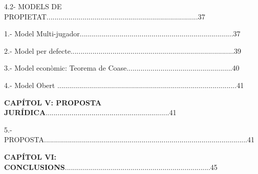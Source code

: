 \documentclass[12pt]{article}
\begin{document}
\vspace{\baselineskip}
\begin{justify}
4.2- MODELS DE PROPIETAT............................................................................37
\end{justify}\par


\vspace{\baselineskip}
1.- Model Multi-jugador.............................................................................37\par


\vspace{\baselineskip}
2.- Model per defecte..................................................................................39\par


\vspace{\baselineskip}
3.- Model econòmic: Teorema de Coase.....................................................40\par


\vspace{\baselineskip}
4.- Model Obert ..........................................................................................41\par


\vspace{\baselineskip}
\begin{justify}
\textbf{CAPÍTOL V: PROPOSTA JURÍDICA}..............................................................41
\end{justify}\par


\vspace{\baselineskip}
\begin{justify}
5.- PROPOSTA......................................................................................................41
\end{justify}\par


\vspace{\baselineskip}

\vspace{\baselineskip}
\begin{justify}
\textbf{CAPÍTOL VI: CONCLUSIONS}.........................................................................45
\end{justify}\par


\vspace{\baselineskip}
\end{document}
